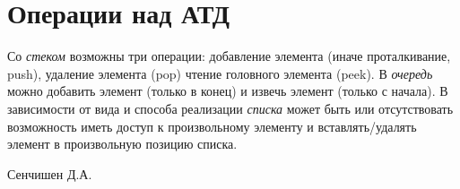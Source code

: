 \documentclass[
	12pt,
	paper=A4,
	oneside,
	draft
]{scrreprt}
\begin{document}
\section{Операции над АТД}
Со \textit{стеком} возможны три операции: добавление элемента (иначе проталкивание, push), удаление элемента (pop) чтение головного элемента (peek).
В \textit{очередь} можно добавить элемент (только в конец) и извечь элемент (только с начала).
В зависимости от вида и способа реализации \textit{списка} может быть или отсутствовать возможность иметь доступ к произвольному элементу и вставлять/удалять элемент в произвольную позицию списка.

\vfill
\begin{flushright}
Сенчишен Д.А.
\end{flushright}
\end{document}
